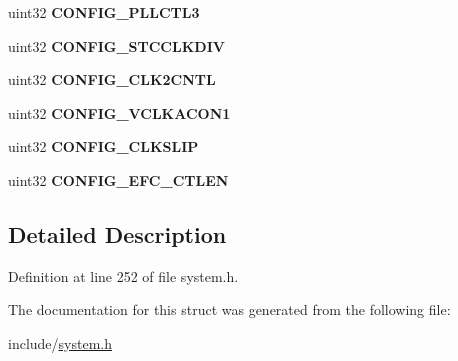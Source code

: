 \begin{DoxyCompactItemize}
uint32 {\bfseries C\+O\+N\+F\+I\+G\+\_\+\+P\+L\+L\+C\+T\+L3}
\item 
\mbox{\label{structsystem__config__reg_ae949bec7b08c4f760600d9831dcafaa4}} 
uint32 {\bfseries C\+O\+N\+F\+I\+G\+\_\+\+S\+T\+C\+C\+L\+K\+D\+IV}
\item 
\mbox{\label{structsystem__config__reg_a531debcbaaea108d2ed5add631c1c35a}} 
uint32 {\bfseries C\+O\+N\+F\+I\+G\+\_\+\+C\+L\+K2\+C\+N\+TL}
\item 
\mbox{\label{structsystem__config__reg_a524f09a691b864b634d428351aa4e30e}} 
uint32 {\bfseries C\+O\+N\+F\+I\+G\+\_\+\+V\+C\+L\+K\+A\+C\+O\+N1}
\item 
\mbox{\label{structsystem__config__reg_a184f7cd027a0de1836b139dc35aab48a}} 
uint32 {\bfseries C\+O\+N\+F\+I\+G\+\_\+\+C\+L\+K\+S\+L\+IP}
\item 
\mbox{\label{structsystem__config__reg_a86dc5753f1418224d0fa310a9ff849d8}} 
uint32 {\bfseries C\+O\+N\+F\+I\+G\+\_\+\+E\+F\+C\+\_\+\+C\+T\+L\+EN}
\end{DoxyCompactItemize}


\subsection{Detailed Description}


Definition at line 252 of file system.\+h.



The documentation for this struct was generated from the following file\+:\begin{DoxyCompactItemize}
\item 
include/\mbox{\hyperlink{system_8h}{system.\+h}}\end{DoxyCompactItemize}
